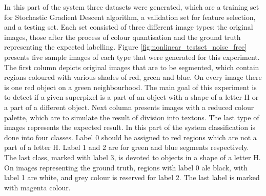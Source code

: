 In this part of the system three datasets were generated, which are a training set for Stochastic Gradient Descent algorithm, a validation set for feature selection, and a testing set. Each set consisted of three different image types: the original images, those after the process of colour quantisation and the ground truth representing the expected labelling. Figure
\ref{fig:nonlinear_testset_noise_free} presents five sample images of each type that were generated for this experiment.
The first column depicts original images that are to be segmented, which contain regions coloured with various shades of red, green and blue. On every image there is one red object on a green neighbourhood. The main goal of this experiment is to detect if a given superpixel is a part of an object with a shape of a letter H or a part of a different object. Next column presents images with a reduced colour palette, which are to simulate the result of division into textons. The last type of images represents the expected result. In this part of the system classification is done into four classes. Label 0 should be assigned to red regions which are not a part of a letter H. Label 1 and 2 are for green and blue segments respectively. The last class, marked with label 3, is devoted to objects in a shape of a letter H. On images representing the ground truth, regions with label 0 ale black, with label 1 are white, and grey colour is reserved for label 2. The last label is marked with magenta colour. 

